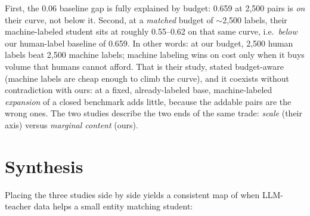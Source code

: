 \documentclass[a4paper,oneside,bibliography=totoc]{scrbook}
\begin{document}
First, the 0.06 baseline gap is fully explained by budget: 0.659 at 2{,}500 pairs is \emph{on} their curve, not below it. Second, at a \emph{matched} budget of $\sim$2{,}500 labels, their machine-labeled student sits at roughly 0.55--0.62 on that same curve, i.e.\ \emph{below} our human-label baseline of 0.659. In other words: at our budget, 2{,}500 human labels beat 2{,}500 machine labels; machine labeling wins on cost only when it buys volume that humans cannot afford. That is their study, stated budget-aware (machine labels are cheap enough to climb the curve), and it coexists without contradiction with ours: at a fixed, already-labeled base, machine-labeled \emph{expansion} of a closed benchmark adds little, because the addable pairs are the wrong ones. The two studies describe the two ends of the same trade: \emph{scale} (their axis) versus \emph{marginal content} (ours).

\section{Synthesis}
\label{sec:comp_synthesis}

Placing the three studies side by side yields a consistent map of when LLM-teacher data helps a small entity matching student:
\end{document}
